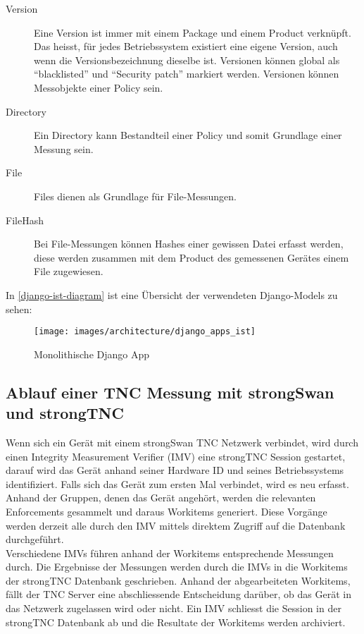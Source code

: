 \begin{description}
	\item[Version] Eine Version ist immer mit einem Package und einem Product
	verknüpft. Das heisst, für jedes Betriebssystem existiert eine eigene Version,
	auch wenn die Versionsbezeichnung dieselbe ist. Versionen können global als
	\enquote{blacklisted} und \enquote{Security patch} markiert werden. Versionen
	können Messobjekte einer Policy sein.

	\item[Directory] Ein Directory kann Bestandteil einer Policy und somit
	Grundlage einer Messung sein.

	\item[File] Files dienen als Grundlage für File-Messungen.

	\item[FileHash] Bei File-Messungen können Hashes einer gewissen Datei erfasst
	werden, diese werden zusammen mit dem Product des gemessenen Gerätes einem
	File zugewiesen.
	
\end{description}

In \autoref{django-ist-diagram} ist eine Übersicht der verwendeten Django-Models
zu sehen:
\begin{figure}[H]
	\centering
	\texttt{[image: images/architecture/django\_apps\_ist]}
	\caption{Monolithische Django App}
	\label{django-ist-diagram}
\end{figure}

\subsection{Ablauf einer TNC Messung mit strongSwan und strongTNC}

Wenn sich ein Gerät mit einem strongSwan TNC Netzwerk verbindet, wird durch
einen Integrity Measurement Verifier (IMV) eine strongTNC Session gestartet,
darauf wird das Gerät anhand seiner Hardware ID und seines Betriebssystems
identifiziert. Falls sich das Gerät zum ersten Mal verbindet, wird es neu
erfasst. Anhand der Gruppen, denen das Gerät angehört, werden die relevanten
Enforcements gesammelt und daraus Workitems generiert. Diese Vorgänge werden
derzeit alle durch den IMV mittels direktem Zugriff auf die Datenbank
durchgeführt.\\
Verschiedene IMVs führen anhand der Workitems entsprechende Messungen durch. Die
Ergebnisse der Messungen werden durch die IMVs in die Workitems der strongTNC
Datenbank geschrieben. Anhand der abgearbeiteten Workitems, fällt der TNC Server
eine abschliessende Entscheidung darüber, ob das Gerät in das Netzwerk
zugelassen wird oder nicht. Ein IMV schliesst die Session in der strongTNC
Datenbank ab und die Resultate der Workitems werden archiviert.\\

